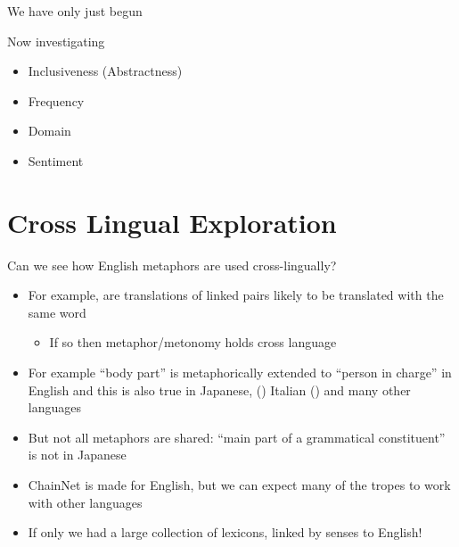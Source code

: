 \documentclass[xetex]{beamer}
\begin{document}
\begin{frame}{We have only just begun}

Now investigating
  \begin{itemize}
\item Inclusiveness (Abstractness)
\item Frequency
\item Domain
\item Sentiment
\end{itemize}
\end{frame}
\section{Cross Lingual Exploration}
\begin{frame}{Can we see how English metaphors are used cross-lingually?}
  \begin{itemize}
  \item For example, are translations of linked pairs likely to be
    translated with the same word
    \begin{itemize}
    \item If so then metaphor/metonomy holds cross language
    \end{itemize}
  \item For example  ``body part'' is metaphorically
    extended to ``person in charge'' in English and this is also true in Japanese,
    () Italian () and many other languages
  \item But not all metaphors are shared:   ``main part of a grammatical constituent'' is not  in Japanese
    \bigskip
  \item ChainNet is made for English, but we can expect many of the
    tropes to work with other languages
  \item If only we had a large collection of lexicons, linked by senses to English!
    

  \end{itemize}
\end{frame}
\end{document}
